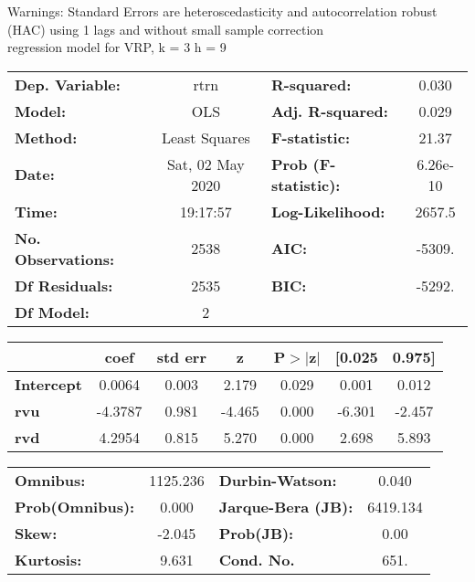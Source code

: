Warnings: \newline
 [1] Standard Errors are heteroscedasticity and autocorrelation robust (HAC) using 1 lags and without small sample correction\\ 

regression model for VRP, k = 3 h = 9\begin{center}
\begin{tabular}{lclc}
\toprule
\textbf{Dep. Variable:}    &       rtrn       & \textbf{  R-squared:         } &     0.030   \\
\textbf{Model:}            &       OLS        & \textbf{  Adj. R-squared:    } &     0.029   \\
\textbf{Method:}           &  Least Squares   & \textbf{  F-statistic:       } &     21.37   \\
\textbf{Date:}             & Sat, 02 May 2020 & \textbf{  Prob (F-statistic):} &  6.26e-10   \\
\textbf{Time:}             &     19:17:57     & \textbf{  Log-Likelihood:    } &    2657.5   \\
\textbf{No. Observations:} &        2538      & \textbf{  AIC:               } &    -5309.   \\
\textbf{Df Residuals:}     &        2535      & \textbf{  BIC:               } &    -5292.   \\
\textbf{Df Model:}         &           2      & \textbf{                     } &             \\
\bottomrule
\end{tabular}
\begin{tabular}{lcccccc}
                   & \textbf{coef} & \textbf{std err} & \textbf{z} & \textbf{P$> |$z$|$} & \textbf{[0.025} & \textbf{0.975]}  \\
\midrule
\textbf{Intercept} &       0.0064  &        0.003     &     2.179  &         0.029        &        0.001    &        0.012     \\
\textbf{rvu}       &      -4.3787  &        0.981     &    -4.465  &         0.000        &       -6.301    &       -2.457     \\
\textbf{rvd}       &       4.2954  &        0.815     &     5.270  &         0.000        &        2.698    &        5.893     \\
\bottomrule
\end{tabular}
\begin{tabular}{lclc}
\textbf{Omnibus:}       & 1125.236 & \textbf{  Durbin-Watson:     } &    0.040  \\
\textbf{Prob(Omnibus):} &   0.000  & \textbf{  Jarque-Bera (JB):  } & 6419.134  \\
\textbf{Skew:}          &  -2.045  & \textbf{  Prob(JB):          } &     0.00  \\
\textbf{Kurtosis:}      &   9.631  & \textbf{  Cond. No.          } &     651.  \\
\bottomrule
\end{tabular}
\end{center}

